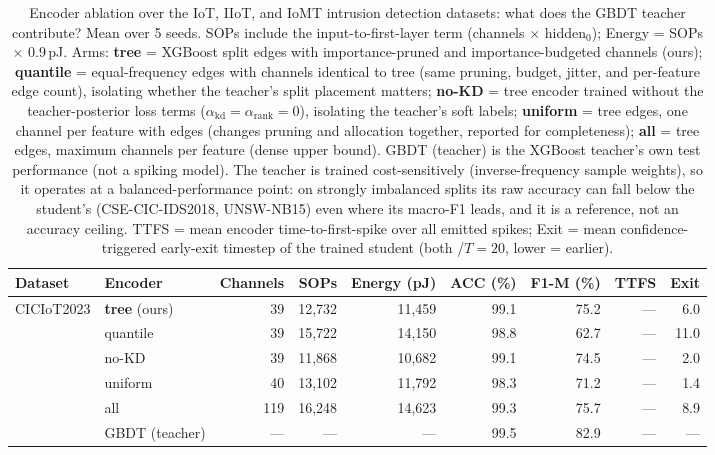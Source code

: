 \begin{table}[!ht]
\centering
\renewcommand{\arraystretch}{1.05}
\caption{Encoder ablation over the IoT, IIoT, and IoMT intrusion detection datasets: what does the GBDT teacher contribute? Mean over 5 seeds. SOPs include the input-to-first-layer term (channels $\times$ hidden$_0$); Energy = SOPs $\times$ 0.9\,pJ. Arms: \textbf{tree} = XGBoost split edges with importance-pruned and importance-budgeted channels (ours); \textbf{quantile} = equal-frequency edges with channels identical to tree (same pruning, budget, jitter, and per-feature edge count), isolating whether the teacher's split placement matters; \textbf{no-KD} = tree encoder trained without the teacher-posterior loss terms ($\alpha_{\mathrm{kd}} = \alpha_{\mathrm{rank}} = 0$), isolating the teacher's soft labels; \textbf{uniform} = tree edges, one channel per feature with edges (changes pruning and allocation together, reported for completeness); \textbf{all} = tree edges, maximum channels per feature (dense upper bound). GBDT (teacher) is the XGBoost teacher's own test performance (not a spiking model). The teacher is trained cost-sensitively (inverse-frequency sample weights), so it operates at a balanced-performance point: on strongly imbalanced splits its raw accuracy can fall below the student's (CSE-CIC-IDS2018, UNSW-NB15) even where its macro-F1 leads, and it is a reference, not an accuracy ceiling. TTFS = mean encoder time-to-first-spike over all emitted spikes; Exit = mean confidence-triggered early-exit timestep of the trained student (both /$T{=}20$, lower = earlier).}
\label{tab:encoder_ablation_iot}
{\scriptsize
\begin{tabular}{l l r r r r r r r}
\toprule
\textbf{Dataset} & \textbf{Encoder} & \textbf{Channels} & \textbf{SOPs} & \textbf{Energy (pJ)} & \textbf{ACC (\%)} & \textbf{F1-M (\%)} & \textbf{TTFS} & \textbf{Exit} \\
\midrule
\multirow{6}{*}{CICIoT2023}
& \textbf{tree} (ours) & 39 & 12,732 & 11,459 & 99.1 & 75.2 & --- & 6.0 \\
& quantile & 39 & 15,722 & 14,150 & 98.8 & 62.7 & --- & 11.0 \\
& no-KD & 39 & 11,868 & 10,682 & 99.1 & 74.5 & --- & 2.0 \\
& uniform & 40 & 13,102 & 11,792 & 98.3 & 71.2 & --- & 1.4 \\
& all & 119 & 16,248 & 14,623 & 99.3 & 75.7 & --- & 8.9 \\
& GBDT (teacher) & --- & --- & --- & 99.5 & 82.9 & --- & --- \\

\end{tabular}}
\end{table}
